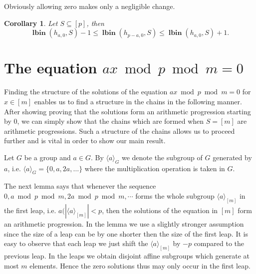 \documentclass{article}
\newcommand{\lbin}[2]{\operatorname{\mathbf{lbin}}({#1}, {#2})}
\newtheorem{corollary}{Corollary}
\begin{document}
Obviously allowing zero makes only a negligible change.
\begin{corollary}
Let $S \subseteq [p]$, then
\[
\lbin{h_{a, 0}}{S} -1 \leq \lbin{h_{p - a, 0}}{S} \leq \lbin{h_{a, 0}}{S} + 1.
\]
\end{corollary}

\section{The equation $ax \bmod p \bmod m = 0$}

Finding the structure of the solutions of the equation $ax \bmod p \bmod m = 0$ for $x \in [m]$ enables us to find a structure in the chains in the following manner. 
After showing proving that the solutions form an arithmetic progression starting by $0$, we can simply show that the chains which are formed when $S=[m]$ are arithmetic progressions. Such a structure of the chains allows us to proceed further and is vital in order to show our main result.

Let $G$ be a group and $a \in G$. By $\langle a \rangle_{G}$ we denote the subgroup of $G$ generated by $a$, i.e. $\langle a \rangle_{G} = \{0, a, 2a, \dots \}$ where the multiplication operation is taken in $G$.

The next lemma says that whenever the sequence $0, a \bmod p \bmod m, 2a \bmod p \bmod m, \cdots$ forms the whole subgroup $\langle a \rangle_{[m]}$ in the first leap, i.e. $a (|\langle a \rangle_{[m]}| < p$, then the solutions of the equation in $[m]$ form an arithmetic progression. In the lemma we use a slightly stronger assumption since the size of a leap can be by one shorter then the size of the first leap. It is easy to observe that each leap we just shift the $\langle a \rangle_{[m]}$ by $-p$ compared to the previous leap. In the leaps we obtain disjoint affine subgroups which generate at most $m$ elements. Hence the zero solutions thus may only occur in the first leap.
\end{document}
